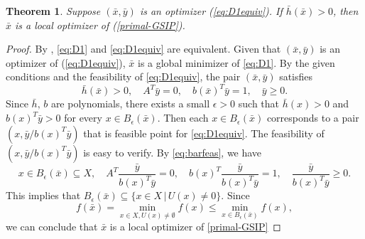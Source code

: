 \documentclass{amsart}
\newcommand{\reff}[1]{(\ref{#1})}
\newtheorem{theorem}{Theorem}[section]
\theoremstyle{plain}
\numberwithin{equation}{section}
\begin{document}
		\begin{theorem}
			Suppose $(\bar{x},\bar{y})$ is an optimizer \reff{eq:D1equiv}.
			If $\bar{h}(\bar{x})>0$,
			then $\bar{x}$ is a local optimizer of \reff{primal-GSIP}.
		\end{theorem}
		\begin{proof}
			By , \eqref{eq:D1} and \eqref{eq:D1equiv} are equivalent.
			Given that $(\bar{x},\bar{y})$ is an optimizer of \reff{eq:D1equiv},
			$\bar{x}$ is a global minimizer of \eqref{eq:D1}.
			By the given conditions and the feasibility of \eqref{eq:D1equiv}, 
			the pair $(\bar{x}, \bar{y})$ satisfies
			\begin{equation}\label{eq:barfeas}
			\bar{h}(\bar{x})>0,\quad A^T\bar{y} = 0,
			\quad b(\bar{x})^T\bar{y} = 1,\quad \bar{y}\ge 0.
			\end{equation}
			Since $\bar{h},\, b$ are polynomials, there exists a small $\epsilon>0$ such that
			$\bar{h}(x)>0$ and $b(x)^T\bar{y}>0$ for every $x\in B_{\epsilon}(\bar{x})$.
			Then each $x\in B_{\epsilon}(\bar{x})$ corresponds to a pair $(x, \bar{y}/b(x)^T\bar{y})$
			that is feasible point for \eqref{eq:D1equiv}. 
			The feasibility of $(x, \bar{y}/b(x)^T\bar{y})$ is easy to verify.
			By \eqref{eq:barfeas}, we have
			\[ x\in B_{\epsilon}(\bar{x})\subseteq X,\quad 
			A^T\frac{\bar{y}}{b(x)^T\bar{y}}= 0,\quad  
			b(x)^T \frac{\bar{y}}{b(x)^T\bar{y}} =1,\quad  
			\frac{\bar{y}}{b(x)^T\bar{y}}\ge 0. \]
			This implies that $B_{\epsilon}(\bar{x})\subseteq \{x\in X\,\vert\, U(x)\not=0\}$. Since
			\[
			f(\bar{x}) = \min\limits_{x\in X, U(x)\not=\emptyset} f(x)
			\le \min\limits_{x\in B_{\epsilon}(\bar{x})} f(x),
			\] 
			we can conclude that $\bar{x}$ is a local optimizer of \eqref{primal-GSIP}
		\end{proof}
		
\end{document}
